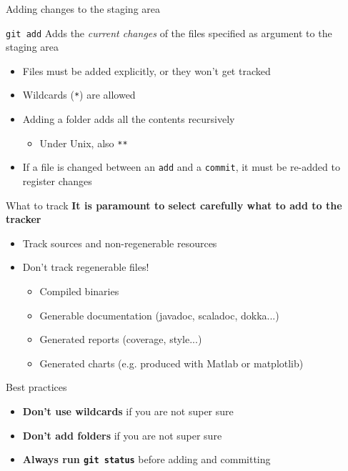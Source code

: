 \documentclass[presentation]{beamer}
\begin{document}
\begin{frame}[allowframebreaks]{Adding changes to the staging area}
    \begin{block}{\texttt{git add}}
        Adds the \emph{current changes} of the files specified as argument to the staging area
        \begin{itemize}
            \item Files must be added explicitly, or they won't get tracked
            \item Wildcards (\texttt{*}) are allowed 
            \item Adding a folder adds all the contents recursively
            \begin{itemize}
                \item Under Unix, also \texttt{**}
            \end{itemize}
            \item If a file is changed between an \texttt{add} and a \texttt{commit}, it must be re-added to register changes
        \end{itemize}
    \end{block}
    \begin{block}{What to track}
        \textbf{It is paramount to select carefully what to add to the tracker}
        \begin{itemize}
            \item Track sources and non-regenerable resources
            \item Don't track regenerable files!
            \begin{itemize}
                \item Compiled binaries
                \item Generable documentation (javadoc, scaladoc, dokka...)
                \item Generated reports (coverage, style...)
                \item Generated charts (e.g. produced with Matlab or matplotlib)
            \end{itemize}
        \end{itemize}
    \end{block}
    \begin{block}{Best practices}
        \begin{itemize}
            \item \textbf{Don't use wildcards} if you are not super sure
            \item \textbf{Don't add folders} if you are not super sure
            \item \textbf{Always run \texttt{git status}} before adding and committing
        \end{itemize}
    \end{block}
\end{frame}
\end{document}
